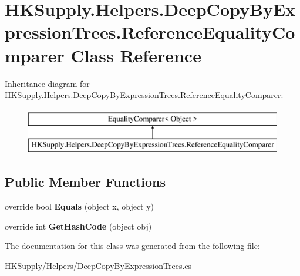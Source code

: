 \hypertarget{class_h_k_supply_1_1_helpers_1_1_deep_copy_by_expression_trees_1_1_reference_equality_comparer}{}\section{H\+K\+Supply.\+Helpers.\+Deep\+Copy\+By\+Expression\+Trees.\+Reference\+Equality\+Comparer Class Reference}
\label{class_h_k_supply_1_1_helpers_1_1_deep_copy_by_expression_trees_1_1_reference_equality_comparer}
Inheritance diagram for H\+K\+Supply.\+Helpers.\+Deep\+Copy\+By\+Expression\+Trees.\+Reference\+Equality\+Comparer\+:\begin{figure}[H]
\begin{center}
\leavevmode
\includegraphics[height=2.000000cm]{class_h_k_supply_1_1_helpers_1_1_deep_copy_by_expression_trees_1_1_reference_equality_comparer}
\end{center}
\end{figure}
\subsection*{Public Member Functions}
\begin{DoxyCompactItemize}
\item 
\mbox{\label{class_h_k_supply_1_1_helpers_1_1_deep_copy_by_expression_trees_1_1_reference_equality_comparer_a1715959527fc6e02a5cd4e098f3e9566}} 
override bool {\bfseries Equals} (object x, object y)
\item 
\mbox{\label{class_h_k_supply_1_1_helpers_1_1_deep_copy_by_expression_trees_1_1_reference_equality_comparer_af54d8e96f3f95c4bae172c80f13f5cf9}} 
override int {\bfseries Get\+Hash\+Code} (object obj)
\end{DoxyCompactItemize}


The documentation for this class was generated from the following file\+:\begin{DoxyCompactItemize}
\item 
H\+K\+Supply/\+Helpers/Deep\+Copy\+By\+Expression\+Trees.\+cs\end{DoxyCompactItemize}
